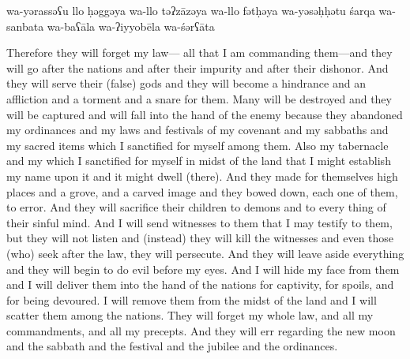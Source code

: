 \begin{transliteration}
    wa-yərassəʕu llo ḥəggəya
    wa-llo təʔzāzəya wa-llo fətḥəya wa-yəsəḥḥətu śarqa wa-sanbata
    wa-baʕāla wa-ʔiyyobēla wa-śərʕāta
\end{transliteration}

\begin{translation}
    Therefore they will forget my law---%
    all that I am commanding them---and they will go after the nations and after
    their impurity and after their dishonor. And they will serve their (false) gods
    and they will become a hindrance and an affliction and a torment and a snare for them.
    Many will be destroyed and they will be captured and will fall into
    the hand of the enemy because they abandoned my ordinances and my laws and festivals of 
    my covenant and my sabbaths and my sacred items which I sanctified for myself among them.
    Also my tabernacle and my \temple which I sanctified for myself in midst of
    the land that I might establish my name upon it and it might dwell (there).
    And they made
    for themselves high places and a grove, and a carved image and they bowed down, each one of them,
    to error. And they will sacrifice their children to demons and to every thing
    of their sinful mind.
    And I will send witnesses to them that
    I may testify to them, but they will not listen and (instead) they will kill the witnesses and even
    those (who) seek after the law, they will persecute. And they will leave aside everything and they will begin to do
    evil before my eyes.
    And I will hide my face
    from them and I will deliver them into the hand of the nations for captivity,
    for spoils, and for being devoured. I will remove them from the midst of the land
    and I will scatter them among the nations.
    They will forget my whole law,
    and all my commandments, and all my precepts. And they will err regarding the new moon and the sabbath
    and the festival and the jubilee and the ordinances.
\end{translation}